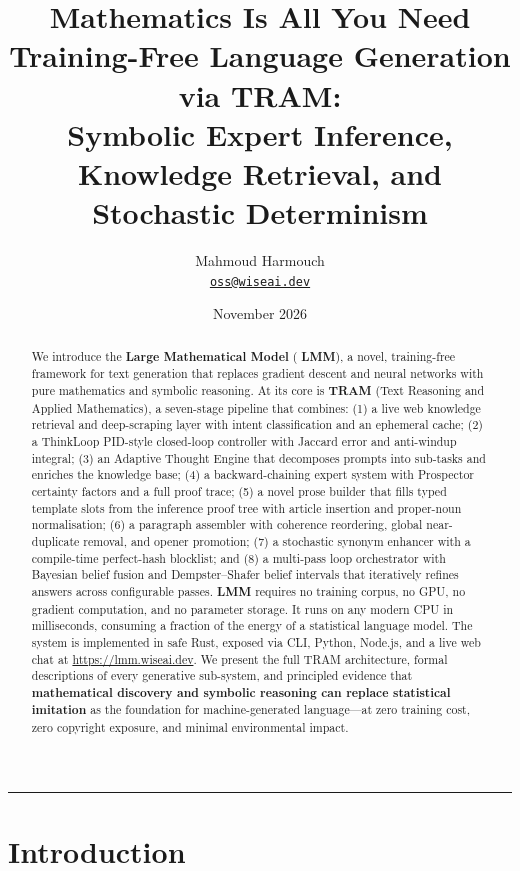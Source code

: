 \documentclass[11pt,a4paper]{article}
\title{%
  \vspace{-0.5cm}
  {\LARGE \textbf{Mathematics Is All You Need}}\\[6pt]
  {\large Training-Free Language Generation via TRAM:\\[2pt]
   Symbolic Expert Inference, Knowledge Retrieval, and Stochastic Determinism}
}
\author{%
  Mahmoud Harmouch\\[2pt]
  \texttt{\href{mailto:oss@wiseai.dev}{oss@wiseai.dev}}
}
\date{November 2026}
\newcommand{\lmm}{\texorpdfstring{%
  \textbf{\color{lmmAccent}LMM}}{LMM}}
\newcommand{\tram}{\texorpdfstring{%
  \textbf{\color{lmmTeal}TRAM}}{TRAM}}
\begin{document}
\maketitle

\begin{abstract}
\noindent
We introduce the \textbf{Large Mathematical Model} (\lmm{}), a novel, training-free framework for
text generation that replaces gradient descent and neural networks with pure mathematics and symbolic
reasoning. At its core is \textbf{\tram{}} (Text Reasoning and Applied Mathematics), a seven-stage
pipeline that combines: (1) a live web knowledge retrieval and deep-scraping layer with intent
classification and an ephemeral cache; (2) a ThinkLoop PID-style closed-loop controller with
Jaccard error and anti-windup integral; (3) an Adaptive Thought Engine that decomposes prompts
into sub-tasks and enriches the knowledge base; (4) a backward-chaining expert system with
Prospector certainty factors and a full proof trace; (5) a novel prose builder that fills typed
template slots from the inference proof tree with article insertion and proper-noun normalisation;
(6) a paragraph assembler with coherence reordering, global near-duplicate removal, and opener
promotion; (7) a stochastic synonym enhancer with a compile-time perfect-hash blocklist; and
(8) a multi-pass loop orchestrator with Bayesian belief fusion and Dempster--Shafer belief intervals
that iteratively refines answers across configurable passes.
\lmm{} requires no training corpus, no GPU, no gradient computation, and no parameter storage.
It runs on any modern CPU in milliseconds, consuming a fraction of the energy of a statistical
language model. The system is implemented in safe Rust, exposed via CLI, Python, Node.js, and
a live web chat at \url{https://lmm.wiseai.dev}. We present the full TRAM architecture, formal
descriptions of every generative sub-system, and principled evidence that
\textbf{mathematical discovery and symbolic reasoning can replace statistical imitation} as the
foundation for machine-generated language---at zero training cost, zero copyright exposure, and
minimal environmental impact.
\end{abstract}

\tableofcontents
\bigskip
{\color{lmmAccent}\hrule}

\section{Introduction}
\label{sec:intro}
\end{document}
